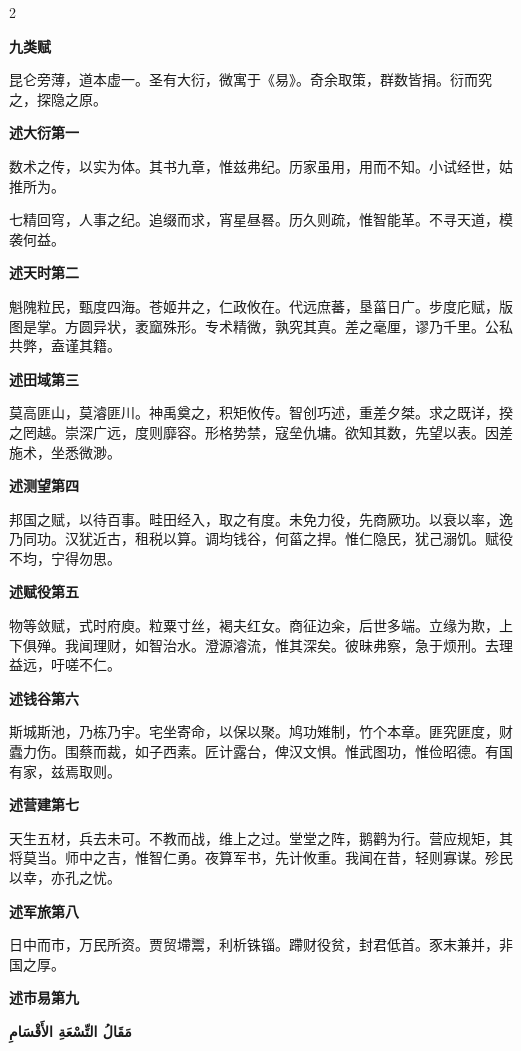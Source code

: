\documentclass[11pt,a4paper]{article}
\newcommand{\ar}[1]{\arabicfont\beginR #1\endR}
\newcommand{\zhtext}[1]{{\chinese #1}}
\newenvironment{bilingual}{%
  \begin{paracol}{2}
}{%
  \end{paracol}
}
\begin{document}
\begin{bilingual}

\begin{leftcolumn*}
\textbf{\zhtext{九类赋}}

昆仑旁薄，道本虚一。圣有大衍，微寓于《易》。奇余取策，群数皆捐。衍而究之，探隐之原。

\textbf{述大衍第一}

数术之传，以实为体。其书九章，惟兹弗纪。历家虽用，用而不知。小试经世，姑推所为。

七精回穹，人事之纪。追缀而求，宵星昼晷。历久则疏，惟智能革。不寻天道，模袭何益。

\textbf{述天时第二}

魁隗粒民，甄度四海。苍姬井之，仁政攸在。代远庶蕃，垦菑日广。步度庀赋，版图是掌。方圆异状，袤窳殊形。专术精微，孰究其真。差之毫厘，谬乃千里。公私共弊，盍谨其籍。

\textbf{述田域第三}

莫高匪山，莫濬匪川。神禹奠之，积矩攸传。智创巧述，重差夕桀。求之既详，揆之罔越。崇深广远，度则靡容。形格势禁，寇垒仇墉。欲知其数，先望以表。因差施术，坐悉微渺。

\textbf{述测望第四}

邦国之赋，以待百事。畦田经入，取之有度。未免力役，先商厥功。以衰以率，逸乃同功。汉犹近古，租税以算。调均钱谷，何菑之捍。惟仁隐民，犹己溺饥。赋役不均，宁得勿思。

\textbf{述赋役第五}

物等敛赋，式时府庾。粒粟寸丝，褐夫红女。商征边籴，后世多端。立缘为欺，上下俱殚。我闻理财，如智治水。澄源濬流，惟其深矣。彼昧弗察，急于烦刑。去理益远，吁嗟不仁。

\textbf{述钱谷第六}

斯城斯池，乃栋乃宇。宅坐寄命，以保以聚。鸠功雉制，竹个本章。匪究匪度，财蠹力伤。围蔡而裁，如子西素。匠计露台，俾汉文惧。惟武图功，惟俭昭德。有国有家，兹焉取则。

\textbf{述营建第七}

天生五材，兵去未可。不教而战，维上之过。堂堂之阵，鹅鹳为行。营应规矩，其将莫当。师中之吉，惟智仁勇。夜算军书，先计攸重。我闻在昔，轻则寡谋。殄民以幸，亦孔之忧。

\textbf{述军旅第八}

日中而市，万民所资。贾贸墆鬻，利析铢锱。蹛财役贫，封君低首。豕末兼并，非国之厚。

\textbf{述市易第九}
\end{leftcolumn*}

\begin{rightcolumn*}
\ar{\textbf{مَقَالُ التِّسْعَةِ الأَقْسَامِ}}


\end{rightcolumn*}
\end{bilingual}
\end{document}
